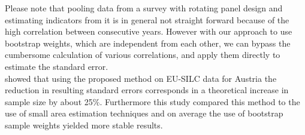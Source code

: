 \documentclass{scrartcl}
\begin{document}
Please note that pooling data from a survey with rotating panel design and estimating indicators from it is in general not straight forward because of the high correlation between consecutive years. However with our approach to use bootstrap weights, which are independent from each other, we can bypass the cumbersome calculation of various correlations, and apply them directly to estimate the standard error.\\
\citep{silcstudy} showed that using the proposed method on EU-SILC data for Austria the reduction in resulting standard errors corresponds in a theoretical increase in sample size by about 25$\%$. Furthermore this study compared this method to the use of small area estimation techniques and on average the use of bootstrap sample weights yielded more stable results.

\newpage

\end{document}
